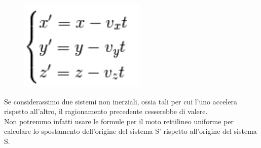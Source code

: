\documentclass{article}
\begin{document}
\begin{figure}[H]
    \centering
    \includegraphics[scale=0.4]{Trasformazioni di galileo 3.png}
    \label{fig:my_label}
\end{figure}
\noindent
Se considerassimo due sistemi non inerziali, ossia tali per cui l'uno accelera rispetto all'altro, il ragionamento precedente cesserebbe di valere.\\
Non potremmo infatti usare le formule per il moto rettilineo uniforme per calcolare lo spostamento dell'origine del sistema S' rispetto all'origine del sistema S.
\newpage
\end{document}
